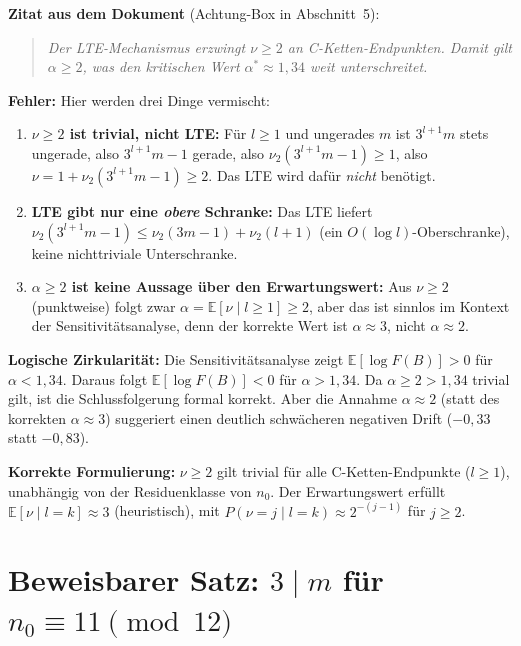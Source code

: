 \documentclass[12pt,a4paper]{article}
\newcommand{\vii}{\nu_2}
\newcommand{\E}{\mathbb{E}}
\newcommand{\logF}{\log F(B)}
\begin{document}
\begin{tcolorbox}[korrektur, title={Fehler 3 --- Missbrauch des LTE}]
\textbf{Zitat aus dem Dokument} (Achtung-Box in Abschnitt~5):
\begin{quote}
\itshape
Der LTE-Mechanismus erzwingt $\nu \geq 2$ an C-Ketten-Endpunkten.
Damit gilt $\alpha \geq 2$, was den kritischen Wert $\alpha^* \approx 1{,}34$
weit unterschreitet.
\end{quote}

\medskip
\textbf{Fehler:} Hier werden drei Dinge vermischt:
\begin{enumerate}[noitemsep]
  \item \textbf{$\nu \geq 2$ ist trivial, nicht LTE:}
        Für $l \geq 1$ und ungerades $m$ ist $3^{l+1}m$ stets ungerade,
        also $3^{l+1}m - 1$ gerade, also $\vii(3^{l+1}m - 1) \geq 1$,
        also $\nu = 1 + \vii(3^{l+1}m-1) \geq 2$.
        Das LTE wird dafür \emph{nicht} benötigt.
  \item \textbf{LTE gibt nur eine \emph{obere} Schranke:}
        Das LTE liefert $\vii(3^{l+1}m - 1) \leq \vii(3m-1) + \vii(l+1)$
        (ein $O(\log l)$-Oberschranke), keine nichttriviale Unterschranke.
  \item \textbf{$\alpha \geq 2$ ist keine Aussage über den Erwartungswert:}
        Aus $\nu \geq 2$ (punktweise) folgt zwar $\alpha = \E[\nu \mid l{\geq}1] \geq 2$,
        aber das ist sinnlos im Kontext der Sensitivitätsanalyse,
        denn der korrekte Wert ist $\alpha \approx 3$, nicht $\alpha \approx 2$.
\end{enumerate}

\medskip
\textbf{Logische Zirkularität:}
Die Sensitivitätsanalyse zeigt $\E[\logF] > 0$ für $\alpha < 1{,}34$.
Daraus folgt $\E[\logF] < 0$ für $\alpha > 1{,}34$.
Da $\alpha \geq 2 > 1{,}34$ trivial gilt, ist die Schlussfolgerung formal korrekt.
Aber die Annahme $\alpha \approx 2$ (statt des korrekten $\alpha \approx 3$)
suggeriert einen deutlich schwächeren negativen Drift ($-0{,}33$ statt $-0{,}83$).

\medskip
\textbf{Korrekte Formulierung:}
$\nu \geq 2$ gilt trivial für alle C-Ketten-Endpunkte ($l \geq 1$),
unabhängig von der Residuenklasse von $n_0$.
Der Erwartungswert erfüllt $\E[\nu \mid l{=}k] \approx 3$ (heuristisch),
mit $P(\nu = j \mid l{=}k) \approx 2^{-(j-1)}$ für $j \geq 2$.
\end{tcolorbox}

\section{Beweisbarer Satz: \texorpdfstring{$3 \mid m$}{3 | m} für \texorpdfstring{$n_0 \equiv 11 \pmod{12}$}{n0 ≡ 11 (mod 12)}}
\label{sec:drei_teilt_m}
\end{document}
